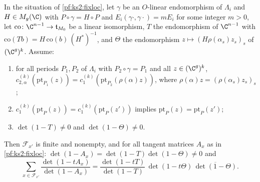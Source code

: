 \begin{lemma}\label{pf:ks2:locsum}
In the situation of \cref{pf:ks2:fixloc}, let $\gamma$ be an $O$-linear endomorphism of $\Lambda_i$ and
$H\in M_g(\C)$ with $P\circ\gamma=H\circ P$ and $E_i(\gamma\cdot,\gamma\cdot)=mE_i$ for some integer $m>0$,
let $\mathrm{co}\colon\C^{n-1}\to\mathfrak{t}_{M_0}$ be a linear isomorphism, $T$ the endomorphism of
$\C^{n-1}$ with $\mathrm{co}(Tb)=H\,\mathrm{co}(b)\,(H^{*})^{-1}$, and $\Theta$ the endomorphism
$z\mapsto(H\rho(\alpha_s)z_s)_s$ of $(\C^g)^k$. Assume:
\begin{enumerate}[label=(\alph*)]
\item for all periods $P_1,P_2$ of $\Lambda_i$ with $P_2\circ\gamma=P_1$ and all $z\in(\C^g)^k$,
  $c_{2,\alpha}^{(k)}(\mathrm{pt}_{P_1}(z))=c_1^{(k)}(\mathrm{pt}_{P_2}(\rho(\alpha)z))$, where
  $\rho(\alpha)z=(\rho(\alpha_s)z_s)_s$;
\item $c_1^{(k)}(\mathrm{pt}_P(z))=c_1^{(k)}(\mathrm{pt}_P(z'))$ implies $\mathrm{pt}_P(z)=\mathrm{pt}_P(z')$;
\item $\det(1-T)\ne0$ and $\det(1-\Theta)\ne0$.
\end{enumerate}
Then $\mathcal F_{x'}$ is finite and nonempty, and for all tangent matrices $A_x$ as in
\cref{pf:ks2:fixloc}: $\det(1-A_x)=\det(1-T)\det(1-\Theta)\ne0$ and
\[
\sum_{x\in\mathcal F_{x'}}\frac{\det(1-tA_x)}{\det(1-A_x)}=\frac{\det(1-tT)}{\det(1-T)}\,
\det(1-t\Theta)\,\overline{\det(1-\Theta)}.
\]
\end{lemma}

